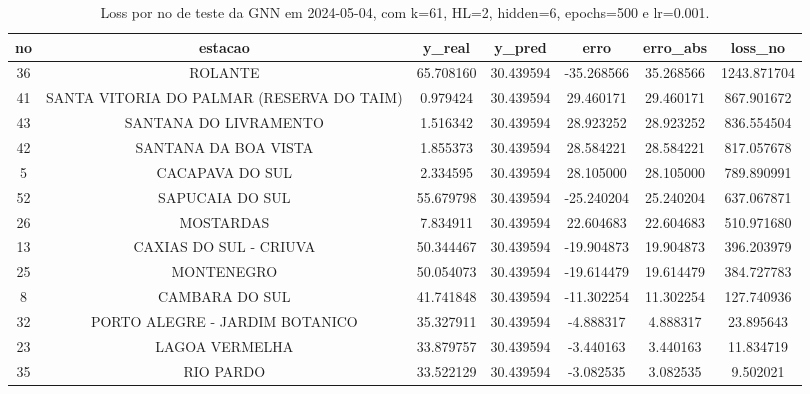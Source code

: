 \begin{table}[h]
\centering
\caption{Loss por no de teste da GNN em 2024-05-04, com k=61, HL=2, hidden=6, epochs=500 e lr=0.001.}
\label{tab:gnn_loss_k61_hl2_h6_e500_d20240504}
\begin{tabular}{ccccccc}
\toprule
no & estacao & y\_real & y\_pred & erro & erro\_abs & loss\_no \\
\midrule
36 & ROLANTE & 65.708160 & 30.439594 & -35.268566 & 35.268566 & 1243.871704 \\
41 & SANTA VITORIA DO PALMAR (RESERVA DO TAIM) & 0.979424 & 30.439594 & 29.460171 & 29.460171 & 867.901672 \\
43 & SANTANA DO LIVRAMENTO & 1.516342 & 30.439594 & 28.923252 & 28.923252 & 836.554504 \\
42 & SANTANA DA BOA VISTA & 1.855373 & 30.439594 & 28.584221 & 28.584221 & 817.057678 \\
5 & CACAPAVA DO SUL & 2.334595 & 30.439594 & 28.105000 & 28.105000 & 789.890991 \\
52 & SAPUCAIA DO SUL & 55.679798 & 30.439594 & -25.240204 & 25.240204 & 637.067871 \\
26 & MOSTARDAS & 7.834911 & 30.439594 & 22.604683 & 22.604683 & 510.971680 \\
13 & CAXIAS DO SUL - CRIUVA & 50.344467 & 30.439594 & -19.904873 & 19.904873 & 396.203979 \\
25 & MONTENEGRO & 50.054073 & 30.439594 & -19.614479 & 19.614479 & 384.727783 \\
8 & CAMBARA DO SUL & 41.741848 & 30.439594 & -11.302254 & 11.302254 & 127.740936 \\
32 & PORTO ALEGRE - JARDIM BOTANICO & 35.327911 & 30.439594 & -4.888317 & 4.888317 & 23.895643 \\
23 & LAGOA VERMELHA & 33.879757 & 30.439594 & -3.440163 & 3.440163 & 11.834719 \\
35 & RIO PARDO & 33.522129 & 30.439594 & -3.082535 & 3.082535 & 9.502021 \\
\bottomrule
\end{tabular}
\end{table}
